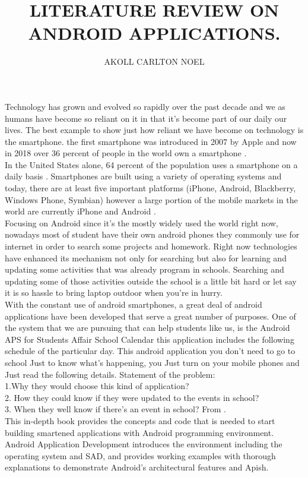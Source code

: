 \documentclass[10pt,a4paper]{report}
\author{AKOLL CARLTON NOEL}
\title{LITERATURE REVIEW ON ANDROID APPLICATIONS.}
\begin{document}
\maketitle

Technology has grown and evolved so rapidly over the past decade and we as humans have become so reliant on it in that it’s become part of our daily our lives. The best example to show just how reliant we have become on technology is the smartphone. the first smartphone was introduced in 2007 by Apple and now in 2018 over 36 percent of people in the world own a smartphone \cite{r1} . \\
In the United States alone, 64 percent of the population uses a smartphone on a daily basis \cite{r2} . Smartphones are built using a variety of operating systems and today, there are at least five important platforms (iPhone, Android, Blackberry, Windows Phone, Symbian) \cite{r3}  however a large portion of the mobile markets in the world are currently iPhone and Android \cite{r4} .\\

Focusing on Android since it’s the mostly widely used the world right now, nowadays most of student have their own android phones they commonly use for internet in order to search some projects and homework. Right now technologies have enhanced its mechanism not only for searching but also for learning and updating some activities that was already program in schools. Searching and updating some of those activities outside the school is a little bit hard or let say it is so hassle to bring laptop outdoor when you’re in hurry.\\

With the constant use of android smartphones, a great deal of android applications have been developed that serve a great number of purposes. One of the system that we are pursuing that can help students like us, is the Android APS for Students Affair School Calendar this application includes the following schedule of the particular day. This android application you don’t need to go to school Just to know what’s happening, you Just turn on your mobile phones and Just read the following details. Statement of the problem:\\
1.Why they would choose this kind of application?\\
 2. How they could know if they were updated to the events in school?\\
  3. When they well know if there’s an event in school?
From \cite{r5} .\\
 This in-depth book provides the concepts and code that is needed to start building smartened applications with Android programming environment. Android Application Development introduces the environment including the operating system and SAD, and provides working examples with thorough explanations to demonstrate Android’s architectural features and Apish.
  

\end{document}
